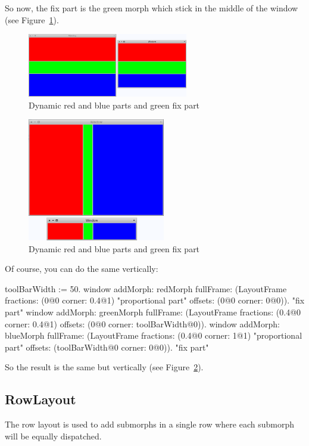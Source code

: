 \documentclass[a4paper,10pt,twoside]{book}
\begin{document}
So now, the fix part is the green morph which stick in the middle of the window (see Figure~\ref{fig:layoutFrame3}).

\begin{figure}[ht]\centering
	\includegraphics[width=7cm]{LayoutFrame3}
	\caption{Dynamic red and blue parts and green fix part}
	\label{fig:layoutFrame3}
\end{figure}

\begin{figure}[!ht]\centering
	\includegraphics[width=6cm]{LayoutFrame4}
	\caption{Dynamic red and blue parts and green fix part}
	\label{fig:layoutFrame4}
\end{figure}

Of course, you can do the same vertically:
\begin{code}{}
toolBarWidth := 50.
window
	addMorph: redMorph
	fullFrame: (LayoutFrame
				fractions: (0@0 corner: 0.4@1) "proportional part"
				offsets: (0@0 corner: 0@0)). "fix part"				
window
	addMorph: greenMorph
	fullFrame: (LayoutFrame
				fractions: (0.4@0 corner: 0.4@1)
				offsets: (0@0 corner: toolBarWidth@0)).				
window
	addMorph: blueMorph
	fullFrame: (LayoutFrame
				fractions: (0.4@0 corner: 1@1) "proportional part"
				offsets: (toolBarWidth@0 corner: 0@0)). "fix part"
\end{code}

So the result is the same but vertically (see Figure~\ref{fig:layoutFrame4}).



\subsection{RowLayout}
The row layout is used to add submorphs in a single row where each submorph will be equally dispatched.
\end{document}
